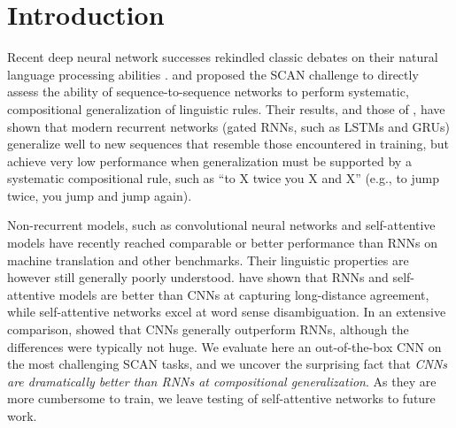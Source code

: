 \section{Introduction}
\label{sec:intro}

Recent deep neural network successes rekindled classic
debates on their natural language processing abilities
\cite[e.g.,][]{Kirov:Cotterell:2018,McCoy:etal:2018,Pater:2018}. \citet{Lake:Baroni:2017}
and \citet{Loula:etal:2018} proposed the SCAN challenge to
directly assess the ability of sequence-to-sequence networks to
perform systematic, compositional generalization of linguistic
rules. Their results, and those of \citet{Bastings:etal:2018}, have
shown that modern recurrent networks (gated RNNs, such as LSTMs and GRUs) generalize well
to new sequences that resemble those encountered in training,
but achieve very low performance when generalization must be
supported by a systematic compositional rule, such as ``to X twice 
you X and X'' (e.g., to jump twice, you jump and jump again).


Non-recurrent models, such as convolutional neural networks
\cite[CNNs,][]{kalchbrenner:etal:2016, gehring:etal:2016,
  gehring:etal:2017} and self-attentive models
\cite{vaswani:etal:2017, chen:etal:2018} have recently reached
comparable or better performance than RNNs on machine translation and
other benchmarks. Their linguistic properties are however still
generally poorly understood.  have shown that
RNNs and self-attentive models are better than CNNs at capturing
long-distance agreement, while self-attentive networks excel at word
sense disambiguation. In an extensive comparison,
 showed that CNNs generally outperform RNNs,
although the differences were typically not huge. We evaluate here an out-of-the-box CNN on the most
challenging SCAN tasks, and we uncover the surprising fact that
\emph{CNNs are dramatically better than RNNs at compositional
  generalization}. As they are more cumbersome to train, we leave
testing of self-attentive networks to future work.

